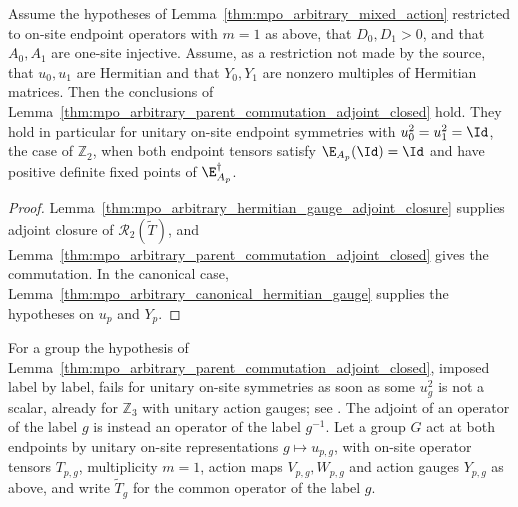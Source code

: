 \begin{lemma}
    \label{thm:mpo_arbitrary_parent_commutation_hermitian_gauge}
    \leanok
    Assume the hypotheses of Lemma~\ref{thm:mpo_arbitrary_mixed_action}
    restricted to on-site endpoint operators with $m=1$ as above, that
    $D_0,D_1>0$, and that $A_0,A_1$ are one-site injective. Assume, as a
    restriction not made by the source, that $u_0,u_1$ are Hermitian and
    that $Y_0,Y_1$ are nonzero multiples of Hermitian matrices. Then the
    conclusions of
    Lemma~\ref{thm:mpo_arbitrary_parent_commutation_adjoint_closed} hold.
    They hold in particular for unitary on-site endpoint symmetries with
    $u_0^2=u_1^2=\Id$, the case of $\mathbb Z_2$, when both endpoint tensors
    satisfy $\E_{A_p}(\Id)=\Id$ and have positive definite fixed points of
    $\E_{A_p}^\dagger$.
\end{lemma}
\begin{proof}
    \leanok
    Lemma~\ref{thm:mpo_arbitrary_hermitian_gauge_adjoint_closure} supplies
    adjoint closure of $\mathcal R_2(\widetilde T)$, and
    Lemma~\ref{thm:mpo_arbitrary_parent_commutation_adjoint_closed} gives
    the commutation. In the canonical case,
    Lemma~\ref{thm:mpo_arbitrary_canonical_hermitian_gauge} supplies the
    hypotheses on $u_p$ and $Y_p$.
\end{proof}

For a group the hypothesis of
Lemma~\ref{thm:mpo_arbitrary_parent_commutation_adjoint_closed}, imposed
label by label, fails for unitary on-site symmetries as soon as some
$u_g^2$ is not a scalar, already for $\mathbb Z_3$ with unitary action
gauges; see \cite{gap:glm23_mixed_path_parent_commutation}. The adjoint
of an operator of the label $g$ is instead an operator of the label
$g^{-1}$. Let a group $G$ act at both endpoints by unitary on-site
representations $g\mapsto u_{p,g}$, with on-site operator tensors
$T_{p,g}$, multiplicity $m=1$, action maps $V_{p,g},W_{p,g}$ and action
gauges $Y_{p,g}$ as above, and write $\widetilde T_g$ for the common
operator of the label $g$.

